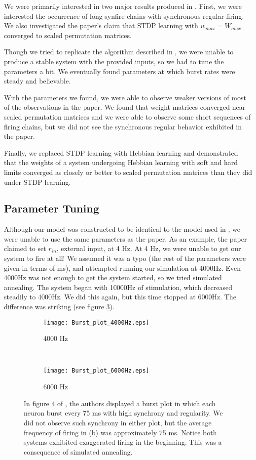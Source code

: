 We were primarily interested in two major results produced in \cite{Fiete}. First, we were interested the occurrence of long synfire chains with synchronous regular firing. We also investigated the paper's claim that STDP learning with \(w_{max} = W_{max}\) converged to scaled permutation matrices.

Though we tried to replicate the algorithm described in \cite{Fiete}, we were unable to produce a stable system with the provided inputs, so we had to tune the parameters a bit. We eventually found parameters at which burst rates were steady and believable. 

With the parameters we found, we were able to observe weaker versions of most of the observations in the paper. We found that weight matrices converged near scaled permutation matrices and we were able to observe some short sequences of firing chains, but we did not see the synchronous regular behavior exhibited in the paper.

Finally, we replaced STDP learning with Hebbian learning and demonstrated that the weights of a system undergoing Hebbian learning with soft and hard limits converged as closely or better to scaled permutation matrices than they did under STDP learning.

\subsection{Parameter Tuning}

Although our model was constructed to be identical to the model used in \cite{Fiete}, we were unable to use the same parameters as the paper. As an example, the paper claimed to set \(r_{in}\), external input, at 4 Hz. At 4 Hz, we were unable to get our system to fire at all! We assumed it was a typo (the rest of the parameters were given in terms of ms), and attempted running our simulation at 4000Hz. Even 4000Hz was not enough to get the system started, so we tried simulated annealing. The system began with 10000Hz of stimulation, which decreased steadily to 4000Hz. We did this again, but this time stopped at 6000Hz. The difference was striking (see figure \ref{burstSTDP}). 

\begin{figure}[H]
\centering
\begin{subfigure}[b]{0.49\textwidth}
\texttt{[image: Burst\_plot\_4000Hz.eps]}
\caption{4000 Hz}
\label{burstSTDP:4000}
\end{subfigure}
\,
\begin{subfigure}[b]{0.49\textwidth}
\texttt{[image: Burst\_plot\_6000Hz.eps]}
\caption{6000 Hz}
\label{burstSTDP:6000}
\end{subfigure}
\caption{In figure 4 of \cite{Fiete}, the authors displayed a burst plot in which each neuron burst every 75 ms with high synchrony and regularity. We did not observe such synchrony in either plot, but the average frequency of firing in (b) was approximately 75 ms. Notice both systems exhibited exaggerated firing in the beginning. This was a consequence of simulated annealing.}
\label{burstSTDP}
\end{figure}

